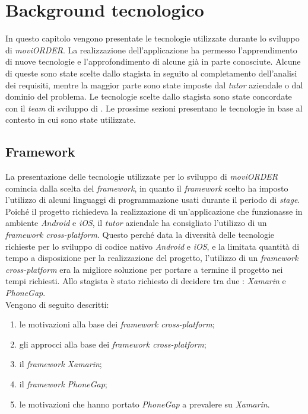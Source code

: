 
\chapter{Background tecnologico} \label{background}

In questo capitolo vengono presentate le tecnologie utilizzate durante lo sviluppo di \textit{moviORDER}. La realizzazione dell'applicazione ha permesso l'apprendimento di nuove tecnologie e l'approfondimento di alcune già in parte conosciute. Alcune di queste sono state scelte dallo stagista in seguito al completamento dell'analisi dei requisiti, mentre la maggior parte sono state imposte dal \textit{tutor} aziendale o dal dominio del problema. Le tecnologie scelte dallo stagista sono state concordate con il \textit{team} di sviluppo di \visione{}. Le prossime sezioni presentano le tecnologie in base al contesto in cui sono state utilizzate.

\section{Framework}	

La presentazione delle tecnologie utilizzate per lo sviluppo di \textit{moviORDER} comincia dalla scelta del \textit{framework}, in quanto il \textit{framework} scelto ha imposto l'utilizzo di alcuni linguaggi di programmazione usati durante il periodo di \textit{stage}. Poiché il progetto richiedeva la realizzazione di un'applicazione che funzionasse in ambiente \textit{Android} e \textit{iOS}, il \textit{tutor} aziendale ha consigliato l'utilizzo di un \textit{framework cross-platform}. Questo perché data la diversità delle tecnologie richieste per lo sviluppo di codice nativo \textit{Android} e \textit{iOS}, e la limitata quantità di tempo a disposizione per la realizzazione del progetto, l'utilizzo di un \textit{framework cross-platform} era la migliore soluzione per portare a termine il progetto nei tempi richiesti. Allo stagista è stato richiesto di decidere tra due : \textit{Xamarin} e \textit{PhoneGap}.\\ Vengono di seguito descritti:
\begin{enumerate}
	\item le motivazioni alla base dei \textit{framework cross-platform};
	\item gli approcci alla base dei \textit{framework cross-platform};
	\item il \textit{framework Xamarin};
	\item il \textit{framework PhoneGap};
	\item le motivazioni che hanno portato \textit{PhoneGap} a prevalere su \textit{Xamarin}.
\end{enumerate}

